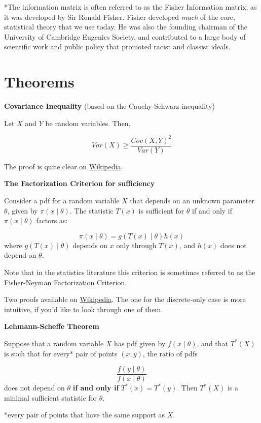 \documentclass[
  letterpaper,
  DIV=11,
  numbers=noendperiod]{scrreprt}
\begin{document}
*The information matrix is often referred to as the Fisher Information
matrix, as it was developed by Sir Ronald Fisher. Fisher developed
\emph{much} of the core, statistical theory that we use today. He was
also the founding chairman of the University of Cambridge Eugenics
Society, and contributed to a large body of scientific work and public
policy that promoted racist and classist ideals.

\section{Theorems}\label{theorems-3}

\textbf{Covariance Inequality} (based on the Cauchy-Schwarz inequality)

Let \(X\) and \(Y\) be random variables. Then,

\[
Var(X) \geq \frac{Cov(X, Y)^2}{Var(Y)}
\]

The proof is quite clear on
\href{https://en.wikipedia.org/wiki/Cauchy\%E2\%80\%93Schwarz_inequality}{Wikipedia}.

\textbf{The Factorization Criterion for sufficiency}

Consider a pdf for a random variable \(X\) that depends on an unknown
parameter \(\theta\), given by \(\pi(x \mid \theta)\). The statistic
\(T(x)\) is sufficient for \(\theta\) if and only if
\(\pi(x \mid \theta)\) factors as:

\[
\pi(x \mid \theta) = g(T(x) \mid \theta) h(x)
\] where \(g(T(x) \mid \theta)\) depends on \(x\) only through \(T(x)\),
and \(h(x)\) does not depend on \(\theta\).

Note that in the statistics literature this criterion is sometimes
referred to as the Fisher-Neyman Factorization Criterion.

Two proofs available on
\href{https://en.wikipedia.org/wiki/Sufficient_statistic\#Proof}{Wikipedia}.
The one for the discrete-only case is more intuitive, if you'd like to
look through one of them.

\textbf{Lehmann-Scheffe Theorem}

Suppose that a random variable \(X\) has pdf given by
\(f(x \mid \theta)\), and that \(T^*(X)\) is such that for every* pair
of points \((x,y)\), the ratio of pdfs

\[
\frac{f(y \mid \theta)}{f(x \mid \theta)}
\] does not depend on \(\theta\) \textbf{if and only if}
\(T^*(x) = T^*(y)\). Then \(T^*(X)\) is a minimal sufficient statistic
for \(\theta\).

*every pair of points that have the same support as \(X\).
\end{document}
